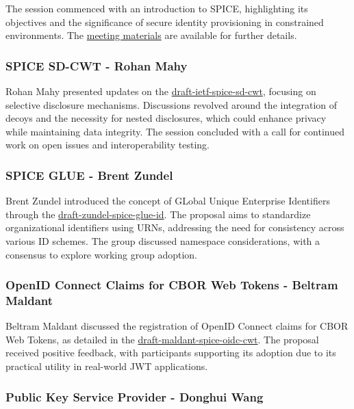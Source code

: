 \documentclass{article}
\begin{document}
The session commenced with an introduction to SPICE, highlighting its objectives and the significance of secure identity provisioning in constrained environments. The \href{https://datatracker.ietf.org/meeting/122/materials/slides-122-spice-chair-slides-00}{meeting materials} are available for further details.

\subsubsection{SPICE SD-CWT - Rohan Mahy}

Rohan Mahy presented updates on the \href{https://datatracker.ietf.org/doc/html/draft-ietf-spice-sd-cwt}{draft-ietf-spice-sd-cwt}, focusing on selective disclosure mechanisms. Discussions revolved around the integration of decoys and the necessity for nested disclosures, which could enhance privacy while maintaining data integrity. The session concluded with a call for continued work on open issues and interoperability testing.

\subsubsection{SPICE GLUE - Brent Zundel}

Brent Zundel introduced the concept of GLobal Unique Enterprise Identifiers through the \href{https://datatracker.ietf.org/doc/html/draft-zundel-spice-glue-id}{draft-zundel-spice-glue-id}. The proposal aims to standardize organizational identifiers using URNs, addressing the need for consistency across various ID schemes. The group discussed namespace considerations, with a consensus to explore working group adoption.

\subsubsection{OpenID Connect Claims for CBOR Web Tokens - Beltram Maldant}

Beltram Maldant discussed the registration of OpenID Connect claims for CBOR Web Tokens, as detailed in the \href{https://datatracker.ietf.org/doc/html/draft-maldant-spice-oidc-cwt}{draft-maldant-spice-oidc-cwt}. The proposal received positive feedback, with participants supporting its adoption due to its practical utility in real-world JWT applications.

\subsubsection{Public Key Service Provider - Donghui Wang}
\end{document}
